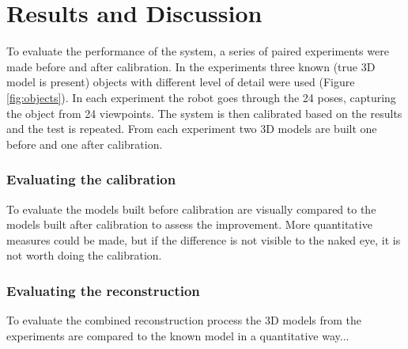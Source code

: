 \chapter{Results and Discussion}
To evaluate the performance of the system, a series of paired experiments were made before and after calibration. In the experiments three known (true 3D model is present) objects with different level of detail were used (Figure \ref{fig:objects}). In each experiment the robot goes through the 24  poses, capturing the object from 24 viewpoints. The system is then calibrated based on the results and the test is repeated. From each experiment two 3D models are built one before and one after calibration.

\subsection{Evaluating the calibration}
To evaluate the models built before calibration are visually compared to the models built after calibration to assess the improvement. More quantitative measures could be made, but if the difference is not visible to the naked eye, it is not worth doing the calibration. 

\subsection{Evaluating the reconstruction}
To evaluate the combined reconstruction process the 3D models from the experiments are compared to the known model in a quantitative way...
